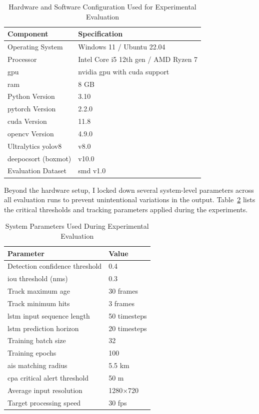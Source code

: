 \begin{table}[H]
\centering
\caption{Hardware and Software Configuration Used for Experimental Evaluation}
\label{c5:tab:hardware}
\begin{tabular}{|p{}|p{}|}
\hline
\textbf{Component} & \textbf{Specification}\\
\hline
Operating System & Windows 11 / Ubuntu 22.04\\
Processor & Intel Core i5 12th gen / AMD Ryzen 7\\
\gls{gpu} & \gls{nvidia} \gls{gpu} with \gls{cuda} support\\
\gls{ram} & 8 GB\\
Python Version & 3.10\\
\gls{pytorch} Version & 2.2.0\\
\gls{cuda} Version & 11.8\\
\gls{opencv} Version & 4.9.0\\
Ultralytics \gls{yolov8} & v8.0\\
\gls{deepocsort} (boxmot) & v10.0\\
Evaluation Dataset & \gls{smd} v1.0\\
\hline
\end{tabular}
\end{table}

Beyond the hardware setup, I locked down several system-level parameters across all evaluation runs to prevent unintentional variations in the output. Table~\ref{c5:tab:parameters} lists the critical thresholds and tracking parameters applied during the experiments.

\begin{table}[H]
\centering
\caption{System Parameters Used During Experimental Evaluation}
\label{c5:tab:parameters}
\begin{tabular}{|p{}|p{}|}
\hline
\textbf{Parameter} & \textbf{Value}\\
\hline
Detection confidence threshold & 0.4\\
\gls{iou} threshold (\gls{nms}) & 0.3\\
Track maximum age & 30 frames\\
Track minimum hits & 3 frames\\
\gls{lstm} input sequence length & 50 timesteps\\
\gls{lstm} prediction horizon & 20 timesteps\\
Training batch size & 32\\
Training epochs & 100\\
\gls{ais} matching radius & 5.5 km\\
\gls{cpa} critical alert threshold & 50 m\\
Average input resolution & 1280$\times$720\\
Target processing speed & 30 \gls{fps}\\
\hline
\end{tabular}
\end{table}

